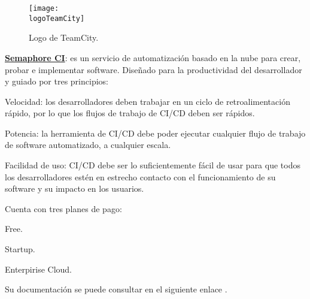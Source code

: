\begin{compactitem}
    \begin{figure}[h]
        \centering
        \texttt{[image: \\logoTeamCity]}
        \caption{Logo de TeamCity.}
    \end{figure}
    \item \textbf{\underline{Semaphore CI}}: es un servicio de automatización basado en la nube para crear, probar e implementar software. Diseñado para la productividad del desarrollador y guiado por tres principios:
    \begin{compactitem}
        \item Velocidad: los desarrolladores deben trabajar en un ciclo de retroalimentación rápido, por lo que los flujos de trabajo de CI/CD deben ser rápidos.
        \item Potencia: la herramienta de CI/CD debe poder ejecutar cualquier flujo de trabajo de software automatizado, a cualquier escala.
        \item Facilidad de uso: CI/CD debe ser lo suficientemente fácil de usar para que todos los desarrolladores estén en estrecho contacto con el funcionamiento de su software y su impacto en los usuarios.
    \end{compactitem}
    Cuenta con tres planes de pago:
    \begin{compactitem}
        \item Free.
        \item Startup.
        \item Enterpirise Cloud.
    \end{compactitem}

    Su documentación se puede consultar en el siguiente enlace \cite{semaphoreCI}.


\end{compactitem}
